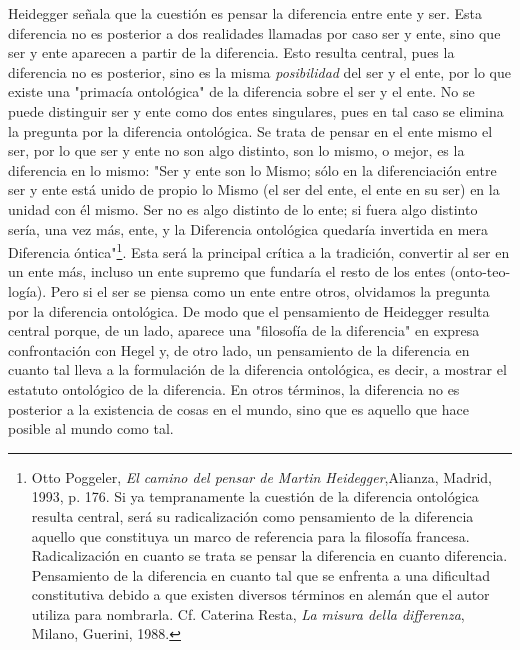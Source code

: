 \documentclass{book}
\begin{document}
Heidegger señala que la cuestión es pensar la diferencia entre ente y
ser. Esta diferencia no es posterior a dos realidades llamadas por caso
ser y ente, sino que ser y ente aparecen a partir de la diferencia. Esto
resulta central, pues la diferencia no es posterior, sino es la misma
\emph{posibilidad} del ser y el ente, por lo que existe una "primacía
ontológica" de la diferencia sobre el ser y el ente. No se puede
distinguir ser y ente como dos entes singulares, pues en tal caso se
elimina la pregunta por la diferencia ontológica. Se trata de pensar en
el ente mismo el ser, por lo que ser y ente no son algo distinto, son lo
mismo, o mejor, es la diferencia en lo mismo: "Ser y ente son lo Mismo;
sólo en la diferenciación entre ser y ente está unido de propio lo Mismo
(el ser del ente, el ente en su ser) en la unidad con él mismo. Ser no
es algo distinto de lo ente; si fuera algo distinto sería, una vez más,
ente, y la Diferencia ontológica quedaría invertida en mera Diferencia
óntica"\footnote{Otto Poggeler, \emph{El camino del pensar de Martin
  Heidegger},Alianza, Madrid, 1993, p. 176. Si ya tempranamente la
  cuestión de la diferencia ontológica resulta central, será su
  radicalización como pensamiento de la diferencia aquello que
  constituya un marco de referencia para la filosofía francesa.
  Radicalización en cuanto se trata se pensar la diferencia en cuanto
  diferencia. Pensamiento de la diferencia en cuanto tal que se enfrenta
  a una dificultad constitutiva debido a que existen diversos términos
  en alemán que el autor utiliza para nombrarla. Cf. Caterina Resta,
  \emph{La misura della differenza}, Milano, Guerini, 1988.}. Esta será
la principal crítica a la tradición, convertir al ser en un ente más,
incluso un ente supremo que fundaría el resto de los entes
(onto-teo-logía). Pero si el ser se piensa como un ente entre otros,
olvidamos la pregunta por la diferencia ontológica. De modo que el
pensamiento de Heidegger resulta central porque, de un lado, aparece una
"filosofía de la diferencia" en expresa confrontación con Hegel y, de
otro lado, un pensamiento de la diferencia en cuanto tal lleva a la
formulación de la diferencia ontológica, es decir, a mostrar el estatuto
ontológico de la diferencia. En otros términos, la diferencia no es
posterior a la existencia de cosas en el mundo, sino que es aquello que
hace posible al mundo como tal.
\end{document}
